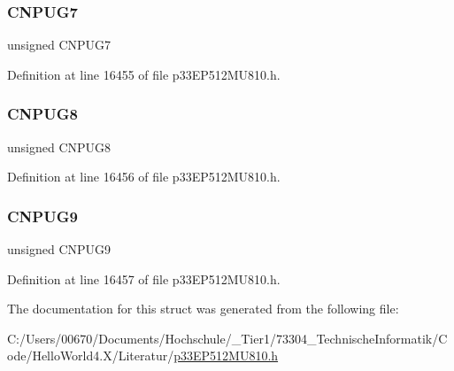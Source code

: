 \subsubsection{\texorpdfstring{C\+N\+P\+U\+G7}{CNPUG7}}
{\footnotesize\ttfamily unsigned C\+N\+P\+U\+G7}



Definition at line 16455 of file p33\+E\+P512\+M\+U810.\+h.

\mbox{\label{structtag_c_n_p_u_g_b_i_t_s_ab1b657a488bafbae533ea7694805a311}} 
\subsubsection{\texorpdfstring{C\+N\+P\+U\+G8}{CNPUG8}}
{\footnotesize\ttfamily unsigned C\+N\+P\+U\+G8}



Definition at line 16456 of file p33\+E\+P512\+M\+U810.\+h.

\mbox{\label{structtag_c_n_p_u_g_b_i_t_s_ac759dde0a3314421e6c9cb43a1cca6fa}} 
\subsubsection{\texorpdfstring{C\+N\+P\+U\+G9}{CNPUG9}}
{\footnotesize\ttfamily unsigned C\+N\+P\+U\+G9}



Definition at line 16457 of file p33\+E\+P512\+M\+U810.\+h.



The documentation for this struct was generated from the following file\+:\begin{DoxyCompactItemize}
\item 
C\+:/\+Users/00670/\+Documents/\+Hochschule/\+\_\+\+Tier1/73304\+\_\+\+Technische\+Informatik/\+Code/\+Hello\+World4.\+X/\+Literatur/\hyperlink{p33_e_p512_m_u810_8h}{p33\+E\+P512\+M\+U810.\+h}\end{DoxyCompactItemize}
